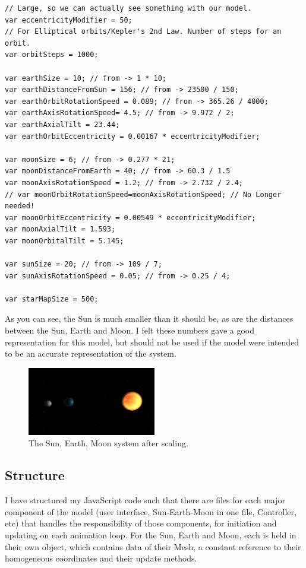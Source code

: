 \documentclass[12pt]{article}
\begin{document}
\begin{lstlisting}
// Large, so we can actually see something with our model.
var eccentricityModifier = 50; 
// For Elliptical orbits/Kepler's 2nd Law. Number of steps for an orbit.
var orbitSteps = 1000;

var earthSize = 10; // from -> 1 * 10; 
var earthDistanceFromSun = 156; // from -> 23500 / 150; 
var earthOrbitRotationSpeed = 0.089; // from -> 365.26 / 4000; 
var earthAxisRotationSpeed= 4.5; // from -> 9.972 / 2; 
var earthAxialTilt = 23.44;
var earthOrbitEccentricity = 0.00167 * eccentricityModifier;

var moonSize = 6; // from -> 0.277 * 21;
var moonDistanceFromEarth = 40; // from -> 60.3 / 1.5
var moonAxisRotationSpeed = 1.2; // from -> 2.732 / 2.4;
// var moonOrbitRotationSpeed=moonAxisRotationSpeed; // No Longer needed!
var moonOrbitEccentricity = 0.00549 * eccentricityModifier;
var moonAxialTilt = 1.593;
var moonOrbitalTilt = 5.145;

var sunSize = 20; // from -> 109 / 7;
var sunAxisRotationSpeed = 0.05; // from -> 0.25 / 4;

var starMapSize = 500;
\end{lstlisting}

As you can see, the Sun is much smaller than it should be, as are the distances between the Sun, Earth and Moon. I felt these numbers gave a good representation for this model, but should not be used if the model were intended to be an accurate representation of the system.

\begin{figure}[H]
        \centering
       
                \includegraphics[width=0.5\textwidth]{images/scales}
                \caption{ The Sun, Earth, Moon system after scaling.}
                \label{fig: The Sun, Earth, Moon system after scaling.}
      
\end{figure}

\subsection{Structure}
I have structured my JavaScript code such that there are files for each major component of the model (user interface, Sun-Earth-Moon in one file, Controller, etc) that handles the responsibility of those components, for initiation and updating on each animation loop. For the Sun, Earth and Moon, each is held in their own object, which contains data of their Mesh, a constant reference to their homogeneous coordinates and their update methods.
\end{document}
